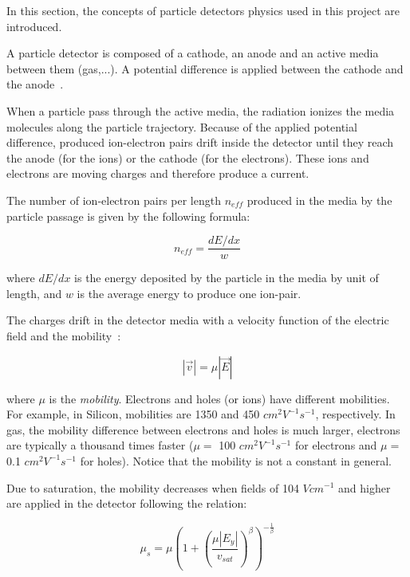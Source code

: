 \documentclass[11pt]{article}
\begin{document}
	\label{equations}

	In this section, the concepts of particle detectors physics used in this project
	are introduced.

	A particle detector is composed of a cathode, an anode and an active media
	between them (gas,...). A potential difference is applied between the cathode
	and the anode~\cite{lphy2236}.

	When a particle pass through the active media, the radiation ionizes the media
	molecules along the particle trajectory.
	Because of the applied potential difference,
	produced ion-electron pairs drift inside the detector until they reach the anode
	(for the ions) or the cathode (for the electrons). These ions and electrons
	are moving charges and therefore produce a current.

	The number of ion-electron pairs per length $n_{eff}$ produced in the media by the
	particle passage is given by the following formula:

	\[n_{eff} = \frac{dE/dx}{w} \]

	where $dE/dx$ is the energy deposited by the particle in the media by
	unit of length, and $w$ is the average energy to produce one ion-pair.

	The charges drift in the detector media with a velocity function of the electric
	field and the mobility~\cite{spieler2005semiconductor}:

	\begin{equation}
		|\vec{v}| = \mu |\vec{E}|
		\label{eq:charge_speed}
	\end{equation}

	where $\mu$ is the \textit{mobility}. Electrons and holes (or ions) have different
	mobilities. For example, in Silicon, mobilities are 1350 and 450 $cm^2V^{-1}s^{-1}$,
	respectively. In gas, the mobility difference between electrons and holes is
	much larger, electrons are typically a thousand times faster ($\mu =$ 100 $cm^2V^{-1}s^{-1}$
	for electrons and $\mu =$ 0.1 $cm^2V^{-1}s^{-1}$ for holes). Notice that the mobility
	is not a constant in general.

	Due to saturation, the mobility decreases when fields of 104 $V cm^{-1}$ and higher are applied in
	the detector following the relation:

	\begin{equation}
		\mu_s = \mu \left (1 + \left (\frac{\mu |E_y|}{v_{sat}} \right )^{\beta} \right )^{-\frac{1}{\beta}}
		\label{eq:saturation}
	\end{equation}
\end{document}
